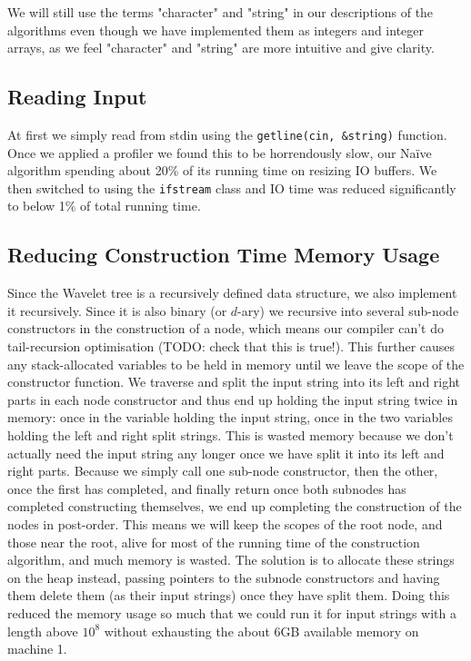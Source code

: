 We will still use the terms "character" and "string" in our descriptions of the algorithms even though we have implemented them as integers and integer arrays, as we feel "character" and "string" are more intuitive and give clarity.


\subsection{Reading Input}
At first we simply read from stdin using the \texttt{getline(cin, \&string)} function. Once we applied a profiler we found this to be horrendously slow, our Naïve algorithm spending about 20\% of its running time on resizing IO buffers. We then switched to using the \texttt{ifstream} class and IO time was reduced significantly to below 1\% of total running time.

\subsection{Reducing Construction Time Memory Usage}
Since the Wavelet tree is a recursively defined data structure, we also implement it recursively. Since it is also binary (or $d$-ary) we recursive into several sub-node constructors in the construction of a node, which means our compiler can't do tail-recursion optimisation (TODO: check that this is true!). This further causes any stack-allocated variables to be held in memory until we leave the scope of the constructor function.
We traverse and split the input string into its left and right parts in each node constructor and thus end up holding the input string twice in memory: once in the variable holding the input string, once in the two variables holding the left and right split strings.
This is wasted memory because we don't actually need the input string any longer once we have split it into its left and right parts.
Because we simply call one sub-node constructor, then the other, once the first has completed, and finally return once both subnodes has completed constructing themselves, we end up completing the construction of the nodes in post-order.
This means we will keep the scopes of the root node, and those near the root, alive for most of the running time of the construction algorithm, and much memory is wasted.
The solution is to allocate these strings on the heap instead, passing pointers to the subnode constructors and having them delete them (as their input strings) once they have split them.
Doing this reduced the memory usage so much that we could run it for input strings with a length above $10^8$ without exhausting the about 6GB available memory on machine 1.


